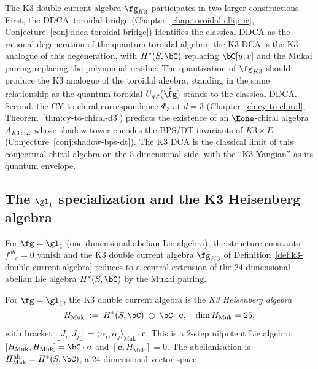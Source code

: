 \begin{remark}
\label{rem:k3-dca-programme-connections}
The K3 double current algebra $\fg_{K3}$ participates in two
larger constructions. First, the DDCA--toroidal bridge
(Chapter~\ref{chap:toroidal-elliptic},
Conjecture~\ref{conj:ddca-toroidal-bridge}) identifies the
classical DDCA as the rational degeneration of the quantum
toroidal algebra; the K3 DCA is the K3 analogue of this
degeneration, with $H^*(S,\bC)$ replacing $\bC[u,v]$ and the
Mukai pairing replacing the polynomial residue. The quantization
of $\fg_{K3}$ should produce the K3 analogue of the toroidal
algebra, standing in the same relationship as the quantum
toroidal $U_{q,t}(\hat{\hat{\fg}})$ stands to the classical DDCA.
Second, the CY-to-chiral correspondence $\Phi_3$ at $d = 3$
(Chapter~\ref{ch:cy-to-chiral},
Theorem~\ref{thm:cy-to-chiral-d3}) predicts the existence of
an $\Eone$-chiral algebra $A_{K3 \times E}$ whose shadow tower
encodes the BPS/DT invariants of $K3 \times E$
(Conjecture~\ref{conj:shadow-bps-dt}). The K3 DCA is the
classical limit of this conjectural chiral algebra on the
$5$-dimensional side, with the ``K3 Yangian'' as its quantum
envelope.
\end{remark}



\subsection{The \texorpdfstring{$\gl_1$}{gl-1} specialization and the K3 Heisenberg algebra}
\label{subsec:k3-dca-gl1}

For $\fg = \gl_1$ (one-dimensional abelian Lie algebra), the structure
constants $f^{ab}{}_{c} = 0$ vanish and the K3 double current algebra
$\fg_{K3}$ of Definition~\ref{def:k3-double-current-algebra} reduces to
a central extension of the $24$-dimensional abelian Lie algebra
$H^*(S, \bC)$ by the Mukai pairing.

\begin{proposition}
\label{prop:k3-heisenberg}
For $\fg = \gl_1$, the K3 double current algebra is the
\emph{K3 Heisenberg algebra}
\[
 H_{\mathrm{Muk}} \;:=\; H^*(S, \bC) \;\oplus\; \bC \cdot \mathbf{c},
 \quad \dim H_{\mathrm{Muk}} = 25,
\]
with bracket
$[J_i, J_j] = \langle \alpha_i, \alpha_j \rangle_{\mathrm{Muk}} \cdot \mathbf{c}$.
This is a $2$-step nilpotent Lie algebra: $[H_{\mathrm{Muk}}, H_{\mathrm{Muk}}]
= \bC \cdot \mathbf{c}$ and $[\mathbf{c}, H_{\mathrm{Muk}}] = 0$.
The abelianisation is $H_{\mathrm{Muk}}^{\mathrm{ab}} = H^*(S, \bC)$,
a $24$-dimensional vector space.
\end{proposition}

